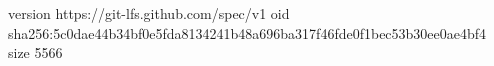 version https://git-lfs.github.com/spec/v1
oid sha256:5c0dae44b34bf0e5fda8134241b48a696ba317f46fde0f1bec53b30ee0ae4bf4
size 5566
